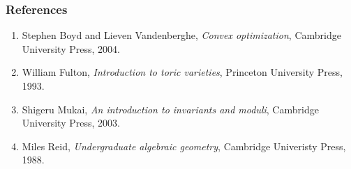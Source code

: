 \documentclass{beamer}
\theoremstyle{definition}
\theoremstyle{definition}
\begin{document}
\begin{frame}
\frametitle{References}
\begin{enumerate}%
\item[]
Stephen Boyd and Lieven Vandenberghe,
\emph{Convex optimization},
Cambridge University Press, 2004.

\vspace{0.5cm}

\item[]
William Fulton,
\emph{Introduction to toric varieties},
Princeton University Press, 1993.

\vspace{0.5cm}

\item[]
Shigeru Mukai,
\emph{An introduction to invariants and moduli},
Cambridge University Press, 2003.

\vspace{0.5cm}

\item[]
Miles Reid,
\emph{Undergraduate algebraic geometry},
Cambridge Univeristy Press, 1988.
\end{enumerate}
\end{frame}
\end{document}
